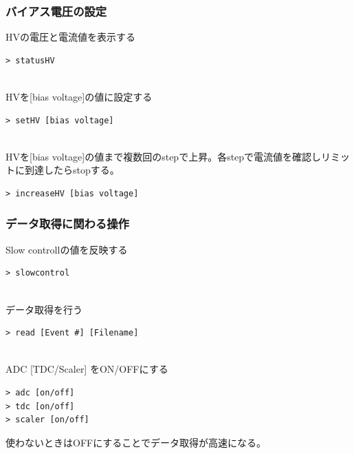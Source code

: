 \documentclass[a4paper]{report}
\begin{document}
\subsubsection{バイアス電圧の設定}

HVの電圧と電流値を表示する
\begin{shadebox}
\begin{verbatim}
> statusHV
\end{verbatim}
\end{shadebox}
　\\
HVを[bias voltage]の値に設定する
\begin{shadebox}
\begin{verbatim}
> setHV [bias voltage]
\end{verbatim}
\end{shadebox}
　\\
HVを[bias voltage]の値まで複数回のstepで上昇。各stepで電流値を確認しリミットに到達したらstopする。
\begin{shadebox}
\begin{verbatim}
> increaseHV [bias voltage]
\end{verbatim}
\end{shadebox}

\subsubsection{データ取得に関わる操作}
Slow controllの値を反映する
\begin{shadebox}
\begin{verbatim}
> slowcontrol
\end{verbatim}
\end{shadebox}
　\\
データ取得を行う
\begin{shadebox}
\begin{verbatim}
> read [Event #] [Filename]
\end{verbatim}
\end{shadebox}
　\\
ADC [TDC/Scaler] をON/OFFにする
\begin{shadebox}
\begin{verbatim}
> adc [on/off]
> tdc [on/off]
> scaler [on/off]
\end{verbatim}
\end{shadebox}
使わないときはOFFにすることでデータ取得が高速になる。
\end{document}
